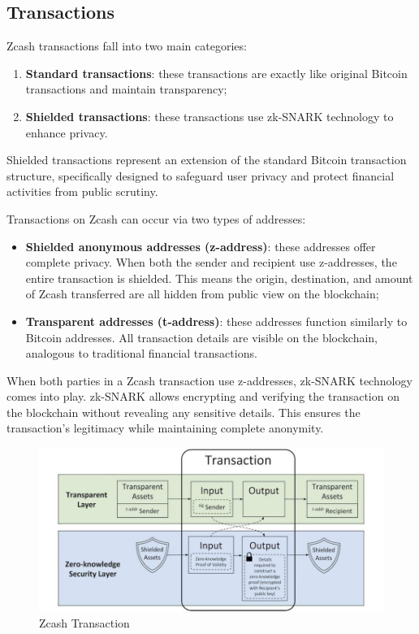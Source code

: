 \subsection{Transactions}

Zcash transactions fall into two main categories:
\begin{enumerate}
    \item \textbf{Standard transactions}: these transactions are exactly like original Bitcoin transactions and maintain transparency;
    \item \textbf{Shielded transactions}: these transactions use zk-SNARK technology to enhance privacy.
\end{enumerate}

\noindent Shielded transactions represent an extension of the standard Bitcoin transaction structure, specifically designed to safeguard user privacy and protect financial activities from public scrutiny.

\noindent Transactions on Zcash can occur via two types of addresses:
\begin{itemize}
    \item \textbf{Shielded anonymous addresses (z-address)}: these addresses offer complete privacy. When both the sender and recipient use z-addresses, the entire transaction is shielded. This means the origin, destination, and amount of Zcash transferred are all hidden from public view on the blockchain;
    \item \textbf{Transparent addresses (t-address)}: these addresses function similarly to Bitcoin addresses. All transaction details are visible on the blockchain, analogous to traditional financial transactions.
\end{itemize}

\noindent When both parties in a Zcash transaction use z-addresses, zk-SNARK technology comes into play. zk-SNARK allows encrypting and verifying the transaction on the blockchain without revealing any sensitive details. This ensures the transaction's legitimacy while maintaining complete anonymity.

\begin{figure}[!ht]
    \centering
    \includegraphics[width=1\linewidth]{img/zcashTransactions.png}
    \caption{Zcash Transaction}
    \label{fig:enter-label}
\end{figure}

